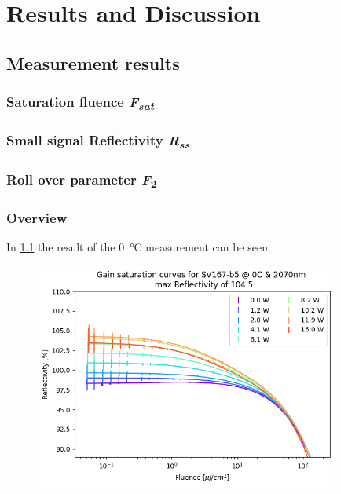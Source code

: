 \chapter{Results and Discussion}\label{chapter:results}

\section{Measurement results}

\subsection{Saturation fluence \textit{F\textsubscript{sat}}}

\subsection{Small signal Reflectivity \textit{R\textsubscript{ss}}}

\subsection{Roll over parameter \textit{F}\textsubscript{2}}

\subsection{Overview}

In \cref{fig:gainSV167} the result of the \qty{0}{\celsius} measurement can be seen. 

\begin{figure}
    \centering
    \includegraphics[width=10cm]{images/sv167-b5_0C.png}
    \caption{}
    \label{fig:gainSV167}
\end{figure}

